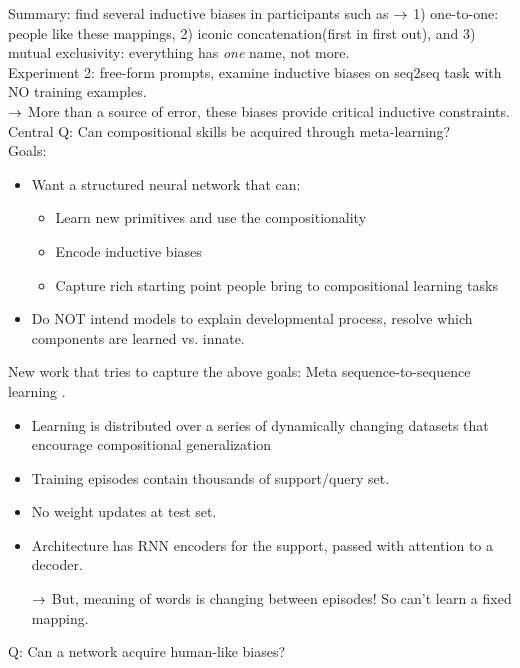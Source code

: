 Summary: find several inductive biases in participants such as $\rightarrow$ 1) one-to-one: people like these mappings, 2) iconic concatenation(first in first out), and 3) mutual exclusivity: everything has {\it one} name, not more. \\

Experiment 2: free-form prompts, examine inductive biases on seq2seq task with NO training examples. \\

$\rightarrow$ More than a source of error, these biases provide critical inductive constraints. \\

Central Q: Can compositional skills be acquired through meta-learning? \\

Goals:
\begin{itemize}
    \item Want a structured neural network that can:
    \begin{itemize}
        \item Learn new primitives and use the compositionality
        \item Encode inductive biases
        \item Capture rich starting point people bring to compositional learning tasks
    \end{itemize}
    \item Do NOT intend models to explain developmental process, resolve which components are learned vs. innate.
\end{itemize}

New work that tries to capture the above goals: Meta sequence-to-sequence learning \cite{lake2019compositional}.
\begin{itemize}
    \item Learning is distributed over a series of dynamically changing datasets that encourage compositional generalization
    \item Training episodes contain thousands of support/query set.
    \item No weight updates at test set.
    
    \item Architecture has RNN encoders for the support, passed with attention to a decoder.
    
    $\rightarrow$ But, meaning of words is changing between episodes! So can't learn a fixed mapping.
\end{itemize}

Q: Can a network acquire human-like biases? \\


